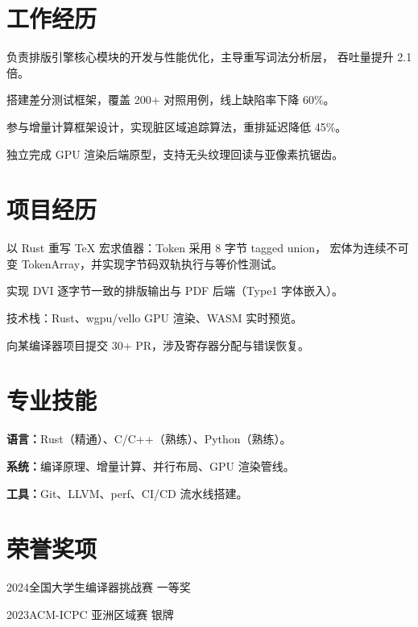 \section{工作经历}

\item{负责排版引擎核心模块的开发与性能优化，主导重写词法分析层，
      吞吐量提升 2.1 倍。}
\item{搭建差分测试框架，覆盖 200+ 对照用例，线上缺陷率下降 60\%。}

\item{参与增量计算框架设计，实现脏区域追踪算法，重排延迟降低 45\%。}
\item{独立完成 GPU 渲染后端原型，支持无头纹理回读与亚像素抗锯齿。}

\section{项目经历}

\item{以 Rust 重写 TeX 宏求值器：Token 采用 8 字节 tagged union，
      宏体为连续不可变 TokenArray，并实现字节码双轨执行与等价性测试。}
\item{实现 DVI 逐字节一致的排版输出与 PDF 后端（Type1 字体嵌入）。}
\item{技术栈：Rust、wgpu/vello GPU 渲染、WASM 实时预览。}

\item{向某编译器项目提交 30+ PR，涉及寄存器分配与错误恢复。}

\section{专业技能}

\item{{\bf 语言：}Rust（精通）、C/C++（熟练）、Python（熟练）。}
\item{{\bf 系统：}编译原理、增量计算、并行布局、GPU 渲染管线。}
\item{{\bf 工具：}Git、LLVM、perf、CI/CD 流水线搭建。}

\section{荣誉奖项}

\item{2024\quad 全国大学生编译器挑战赛 一等奖}
\item{2023\quad ACM-ICPC 亚洲区域赛 银牌}

\bye

